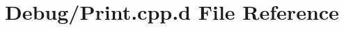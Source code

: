 \hypertarget{_debug_2_print_8cpp_8d}{\section{\-Debug/\-Print.cpp.\-d \-File \-Reference}
\label{_debug_2_print_8cpp_8d}
}

